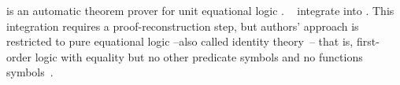 \documentclass[../main.tex]{subfiles}
\begin{document}


 is an automatic theorem prover for unit
equational logic \cite{hillenbrand1997}.
\citeauthor{foster2011integrating}~\cite{foster2011integrating}
integrate  into \Agda
\cite{agdateam}. This integration requires a proof-reconstruction
step, but authors' approach is restricted to pure equational logic
--also called identity theory~\cite{humberstone2011}-- that is,
first-order logic with equality but no other predicate symbols and
no functions symbols~\cite{appel1959}.

\end{document}
